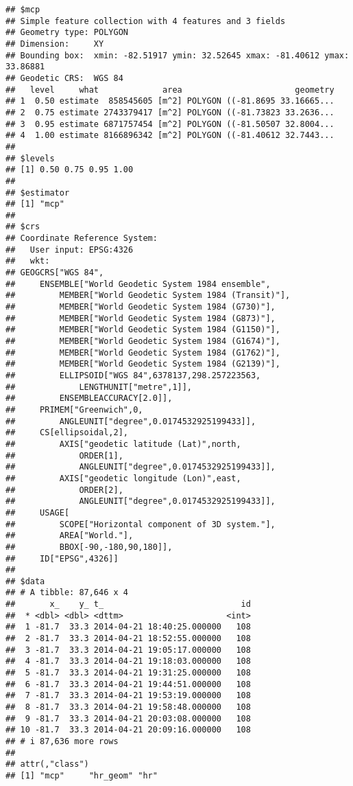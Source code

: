 \documentclass[
]{article}
\begin{document}
\begin{verbatim}
## $mcp
## Simple feature collection with 4 features and 3 fields
## Geometry type: POLYGON
## Dimension:     XY
## Bounding box:  xmin: -82.51917 ymin: 32.52645 xmax: -81.40612 ymax: 33.86881
## Geodetic CRS:  WGS 84
##   level     what             area                       geometry
## 1  0.50 estimate  858545605 [m^2] POLYGON ((-81.8695 33.16665...
## 2  0.75 estimate 2743379417 [m^2] POLYGON ((-81.73823 33.2636...
## 3  0.95 estimate 6871757454 [m^2] POLYGON ((-81.50507 32.8004...
## 4  1.00 estimate 8166896342 [m^2] POLYGON ((-81.40612 32.7443...
## 
## $levels
## [1] 0.50 0.75 0.95 1.00
## 
## $estimator
## [1] "mcp"
## 
## $crs
## Coordinate Reference System:
##   User input: EPSG:4326 
##   wkt:
## GEOGCRS["WGS 84",
##     ENSEMBLE["World Geodetic System 1984 ensemble",
##         MEMBER["World Geodetic System 1984 (Transit)"],
##         MEMBER["World Geodetic System 1984 (G730)"],
##         MEMBER["World Geodetic System 1984 (G873)"],
##         MEMBER["World Geodetic System 1984 (G1150)"],
##         MEMBER["World Geodetic System 1984 (G1674)"],
##         MEMBER["World Geodetic System 1984 (G1762)"],
##         MEMBER["World Geodetic System 1984 (G2139)"],
##         ELLIPSOID["WGS 84",6378137,298.257223563,
##             LENGTHUNIT["metre",1]],
##         ENSEMBLEACCURACY[2.0]],
##     PRIMEM["Greenwich",0,
##         ANGLEUNIT["degree",0.0174532925199433]],
##     CS[ellipsoidal,2],
##         AXIS["geodetic latitude (Lat)",north,
##             ORDER[1],
##             ANGLEUNIT["degree",0.0174532925199433]],
##         AXIS["geodetic longitude (Lon)",east,
##             ORDER[2],
##             ANGLEUNIT["degree",0.0174532925199433]],
##     USAGE[
##         SCOPE["Horizontal component of 3D system."],
##         AREA["World."],
##         BBOX[-90,-180,90,180]],
##     ID["EPSG",4326]]
## 
## $data
## # A tibble: 87,646 x 4
##       x_    y_ t_                            id
##  * <dbl> <dbl> <dttm>                     <int>
##  1 -81.7  33.3 2014-04-21 18:40:25.000000   108
##  2 -81.7  33.3 2014-04-21 18:52:55.000000   108
##  3 -81.7  33.3 2014-04-21 19:05:17.000000   108
##  4 -81.7  33.3 2014-04-21 19:18:03.000000   108
##  5 -81.7  33.3 2014-04-21 19:31:25.000000   108
##  6 -81.7  33.3 2014-04-21 19:44:51.000000   108
##  7 -81.7  33.3 2014-04-21 19:53:19.000000   108
##  8 -81.7  33.3 2014-04-21 19:58:48.000000   108
##  9 -81.7  33.3 2014-04-21 20:03:08.000000   108
## 10 -81.7  33.3 2014-04-21 20:09:16.000000   108
## # i 87,636 more rows
## 
## attr(,"class")
## [1] "mcp"     "hr_geom" "hr"
\end{verbatim}
\end{document}
